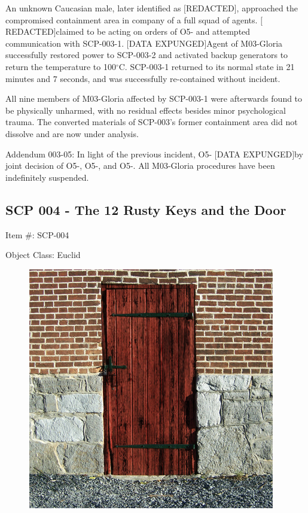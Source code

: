 \documentclass[a4paper, 11pt]{article}
\newcommand{\lb}{\ensuremath{[}}
\newcommand{\rb}{\ensuremath{]}}
\newcommand{\degree}{$^{\circ}$}
\newcommand{\redacted}{\lb REDACTED\rb}
\newcommand{\expunged}{\lb DATA EXPUNGED\rb}
\begin{document}
An unknown Caucasian male, later identified as \redacted, approached the compromised containment area in company of a full squad of agents. \redacted claimed to be acting on orders of O5- and attempted communication with SCP-003-1. \expunged Agent  of M03-Gloria successfully restored power to SCP-003-2 and activated backup generators to return the temperature to 100\degree C. SCP-003-1 returned to its normal state in 21 minutes and 7 seconds, and was successfully re-contained without incident.

All nine members of M03-Gloria affected by SCP-003-1 were afterwards found to be physically unharmed, with no residual effects besides minor psychological trauma. The converted materials of SCP-003's former containment area did not dissolve and are now under analysis.

Addendum 003-05: In light of the previous incident, O5- \expunged by joint decision of O5-, O5-, and O5-. All M03-Gloria procedures have been indefinitely suspended.

\newpage
\subsection{SCP 004 - The 12 Rusty Keys and the Door}
Item \#: SCP-004

Object Class: Euclid

\begin{figure}
\includegraphics[scale=1.6]{img/scp/004.jpg}
\end{figure}
\end{document}
